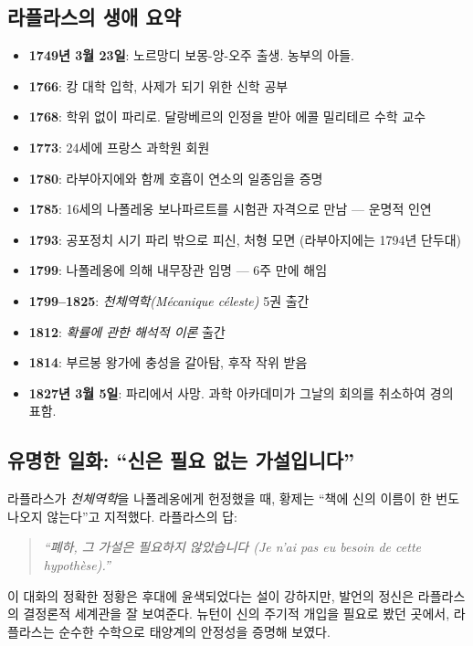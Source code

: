 \documentclass[11pt,a4paper]{article}
\begin{document}
\subsection{라플라스의 생애 요약}

\begin{itemize}
\item \textbf{1749년 3월 23일}: 노르망디 보몽-앙-오주 출생. 농부의 아들.
\item \textbf{1766}: 캉 대학 입학, 사제가 되기 위한 신학 공부
\item \textbf{1768}: 학위 없이 파리로. 달랑베르의 인정을 받아 에콜 밀리테르 수학 교수
\item \textbf{1773}: 24세에 프랑스 과학원 회원
\item \textbf{1780}: 라부아지에와 함께 호흡이 연소의 일종임을 증명
\item \textbf{1785}: 16세의 나폴레옹 보나파르트를 시험관 자격으로 만남 --- 운명적 인연
\item \textbf{1793}: 공포정치 시기 파리 밖으로 피신, 처형 모면 (라부아지에는 1794년 단두대)
\item \textbf{1799}: 나폴레옹에 의해 내무장관 임명 --- 6주 만에 해임
\item \textbf{1799--1825}: \emph{천체역학(Mécanique céleste)} 5권 출간
\item \textbf{1812}: \emph{확률에 관한 해석적 이론} 출간
\item \textbf{1814}: 부르봉 왕가에 충성을 갈아탐, 후작 작위 받음
\item \textbf{1827년 3월 5일}: 파리에서 사망. 과학 아카데미가 그날의 회의를 취소하여 경의 표함.
\end{itemize}

\subsection{유명한 일화: ``신은 필요 없는 가설입니다''}

라플라스가 \emph{천체역학}을 나폴레옹에게 헌정했을 때, 황제는 ``책에 신의 이름이 한 번도 나오지 않는다''고 지적했다. 라플라스의 답:

\begin{quote}
\itshape ``폐하, 그 가설은 필요하지 않았습니다 (Je n'ai pas eu besoin de cette hypothèse).''
\end{quote}

이 대화의 정확한 정황은 후대에 윤색되었다는 설이 강하지만, 발언의 정신은 라플라스의 결정론적 세계관을 잘 보여준다. 뉴턴이 신의 주기적 개입을 필요로 봤던 곳에서, 라플라스는 순수한 수학으로 태양계의 안정성을 증명해 보였다.
\end{document}
